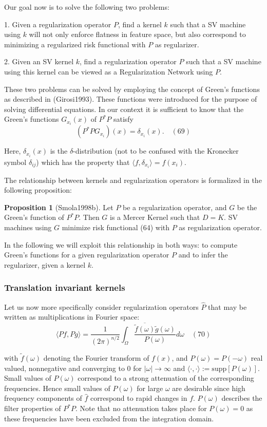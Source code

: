 \documentclass[fleqn,10pt]{olplainarticle}
\begin{document}
Our goal now is to solve the following two problems:

1. Given a regularization operator \(P\), find a kernel \(k\) such that a SV machine using \(k\) will not only enforce flatness in feature space, but also correspond to minimizing a regularized risk functional with \(P\) as regularizer.

2. Given an SV kernel \(k\), find a regularization operator \(P\) such that a SV machine using this kernel can be viewed as a Regularization Network using \(P\).

These two problems can be solved by employing the concept of Green’s functions as described in (Girosi1993). These functions were introduced for the purpose of solving differential equations. In our context it is sufficient to know that the Green’s functions \(G_{x_i}(x)\) of \(P^*P\) satisfy
\[
(P^*PG_{x_i})(x) = \delta_{x_i}(x). \quad (69)
\]

Here, \(\delta_{x_i}(x)\) is the \(\delta\)-distribution (not to be confused with the Kronecker symbol \(\delta_{ij}\)) which has the property that \(\langle f, \delta_{x_i} \rangle = f(x_i)\).

The relationship between kernels and regularization operators is formalized in the following proposition:

\textbf{Proposition 1} (Smola1998b). Let \(P\) be a regularization operator, and \(G\) be the Green’s function of \(P^*P\). Then \(G\) is a Mercer Kernel such that \(D = K\). SV machines using \(G\) minimize risk functional (64) with \(P\) as regularization operator.

In the following we will exploit this relationship in both ways: to compute Green’s functions for a given regularization operator \(P\) and to infer the regularizer, given a kernel \(k\).

\subsubsection{Translation invariant kernels}

Let us now more specifically consider regularization operators \(\hat{P}\) that may be written as multiplications in Fourier space:
\[
\langle Pf, Pg \rangle = \frac{1}{{(2\pi)^{n/2}}} \int_{\Omega} \frac{\overline{\tilde{f}(\omega)}\tilde{g}(\omega)} {{P}(\omega)} d\omega \quad (70)
\]

with \(\tilde{f}(\omega)\) denoting the Fourier transform of \(f(x)\), and \({P}(\omega) = {P}(-\omega)\) real valued, nonnegative and converging to 0 for \(|\omega| \to \infty\) and \(\langle \cdot, \cdot \rangle := \text{supp}[{P}(\omega)]\). Small values of \({P}(\omega)\) correspond to a strong attenuation of the corresponding frequencies. Hence small values of \({P}(\omega)\) for large \(\omega\) are desirable since high frequency components of \(\hat{f}\) correspond to rapid changes in \(f\). \({P}(\omega)\) describes the filter properties of \(P^*P\). Note that no attenuation takes place for \({P}(\omega) = 0\) as these frequencies have been excluded from the integration domain.
\end{document}
